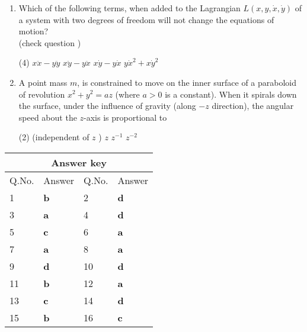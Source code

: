 \begin{enumerate}
	The particle of mass in on the plane undergoes a circular motion with radius $r_{0}$ and angular momentum $L$. When a small radial displacement $\in$ (whew $\in \ll<r_{0}$ ) is applied, its radial coordinate is found to oscillate about $r_{0}$. The frequency of the oscillations is
	{}
	\begin{tasks}(4)
		\task[\textbf{A.}] $\sqrt{\frac{7 m_{2} g}{\left(m_{1}+\frac{m_{2}}{2}\right) r_{0}}}$
		\task[\textbf{B.}] $\sqrt{\frac{7 m_{2} g}{\left(m_{1}+m_{2}\right) r_{0}}}$
		\task[\textbf{C.}] $\sqrt{\frac{3 m_{2} g}{\left(m_{1}+\frac{m_{2}}{2}\right) r_{0}}}$
		\task[\textbf{D.}] $\sqrt{\frac{3 m_{2} g}{\left(m_{1}+m_{2}\right) r_{0}}}$
	\end{tasks}	
	\item Which of the following terms, when added to the Lagrangian $L(x, y, \dot{x}, \dot{y})$ of a system with two degrees of freedom will not change the equations of motion?\\
	(check question )
	{}
	\begin{tasks}(4)
		\task[\textbf{A.}] $x \ddot{x}-y \ddot{y}$
		\task[\textbf{B.}] $x \ddot{y}-y \ddot{x}$
		\task[\textbf{C.}] $x \dot{y}-y \dot{x}$
		\task[\textbf{D.}] $y \dot{x}^{2}+x \dot{y}^{2}$ 
	\end{tasks}
	\item A point mass $m$, is constrained to move on the inner surface of a paraboloid of revolution $x^{2}+y^{2}=a z$ (where $a>0$ is a constant). When it spirals down the surface, under the influence of gravity (along $-z$ direction), the angular speed about the $z$-axis is proportional to
	{}
	\begin{tasks}(2)
		 (independent of $z$ )
		\task[\textbf{B.}] $z$
		\task[\textbf{C.}]  $z^{-1}$
		\task[\textbf{D.}] $z^{-2}$
	\end{tasks}	
\end{enumerate}
\setlength\arrayrulewidth{1pt}
\begin{table}[H]
	\centering
	\begin{tabular}{|p{1.5cm}|p{1.5cm}||p{1.5cm}|p{1.5cm}|}
		\hline
		\multicolumn{4}{|c|}{\textbf{Answer key}}\\\hline\hline
		\rowcolor{ocrel}Q.No.&Answer&Q.No.&Answer\\\hline
		1&\textbf{b} &2&\textbf{d}\\\hline 
		3&\textbf{a} &4&\textbf{d} \\\hline
		5&\textbf{c} &6&\textbf{a} \\\hline
		7&\textbf{a}&8&\textbf{a}\\\hline
		9&\textbf{d}&10&\textbf{d}\\\hline
		11&\textbf{b} &12&\textbf{a}\\\hline
		13&\textbf{c}&14&\textbf{d}\\\hline
		15&\textbf{b}&16&\textbf{c}\\\hline
		
	\end{tabular}
\end{table}
